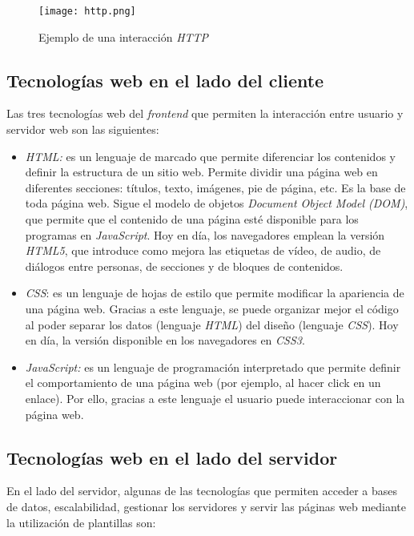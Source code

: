 \begin{figure}[h!]
    \centering
    \texttt{[image: http.png]}
    \caption[Ejemplo de una interacción \textit{HTTP}]{Ejemplo de una interacción \textit{HTTP}\footnotemark} 
    \label{fig:http}
\end{figure}

\clearpage
\subsection{Tecnologías web en el lado del cliente}
Las tres tecnologías web del \textit{frontend} que permiten la interacción entre usuario y servidor web son las siguientes:
\begin{itemize}
    \item \textit{HTML:} es un lenguaje de marcado que permite diferenciar los contenidos y definir la estructura de un sitio web. Permite dividir una página web en diferentes secciones: títulos, texto, imágenes, pie de página, etc. Es la base de toda página web. Sigue el modelo de objetos \textit{Document Object Model (DOM)}, que permite que el contenido de una página esté disponible para los programas en \textit{JavaScript}. Hoy en día, los navegadores emplean la versión \textit{HTML5}, que introduce como mejora las etiquetas de vídeo, de audio, de diálogos entre personas, de secciones y de bloques de contenidos.
    \item \textit{CSS}: es un lenguaje de hojas de estilo que permite modificar la apariencia de una página web. Gracias a este lenguaje, se puede organizar mejor el código al poder separar los datos (lenguaje \textit{HTML}) del diseño (lenguaje \textit{CSS}). Hoy en día, la versión disponible en los navegadores en \textit{CSS3}.
    \item \textit{JavaScript:} es un lenguaje de programación interpretado que permite definir el comportamiento de una página web (por ejemplo, al hacer click en un enlace). Por ello, gracias a este lenguaje el usuario puede interaccionar con la página web.
\end{itemize}

\subsection{Tecnologías web en el lado del servidor}
En el lado del servidor, algunas de las tecnologías que permiten acceder a bases de datos, escalabilidad, gestionar los servidores y servir las páginas web mediante la utilización de plantillas son:

